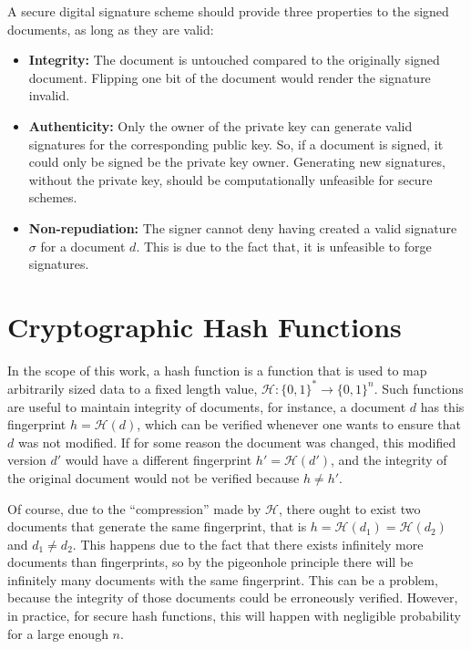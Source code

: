 \documentclass{ufsctex/ufsctex}
\begin{document}
A secure digital signature scheme should provide three properties to the signed
documents, as long as they are valid:

\begin{itemize}

	\item \textbf{Integrity:} The document is untouched compared to the
	originally signed document. Flipping one bit of the document would render
	the signature invalid.

	\item \textbf{Authenticity:} Only the owner of the private key can generate
	valid signatures for the corresponding public key. So, if a document is
	signed, it could only be signed be the private key owner. Generating new
	signatures, without the private key, should be computationally unfeasible
	for secure schemes.

	\item \textbf{Non-repudiation:} The signer cannot deny having created a
	valid signature $\sigma$ for a document $d$. This is due to the fact that,
	it is unfeasible to forge signatures.

\end{itemize}

\section{Cryptographic Hash Functions}

In the scope of this work, a hash function is a function that is used to map
arbitrarily sized data to a fixed length value,  $\mathcal{H}:\{0,
1\}^* \rightarrow \{0, 1\}^n$. Such functions are useful to maintain integrity
of documents, for instance, a document $d$ has this fingerprint $h =
\mathcal{H}(d)$, which can be verified whenever one wants to ensure that $d$
was not modified. If for some reason the document was changed, this modified
version $d'$ would have a different fingerprint $h' = \mathcal{H}(d')$, and the
integrity of the original document would not be verified because $h \ne h'$.

Of course, due to the ``compression'' made by $\mathcal{H}$, there ought to
exist two documents that generate the same fingerprint, that is $h =
\mathcal{H}(d_1) = \mathcal{H}(d_2)$ and $d_1 \ne d_2$. This happens due to the
fact that there exists infinitely more documents than fingerprints, so by the
pigeonhole principle there will be infinitely many documents with the same
fingerprint. This can be a problem, because the integrity of those documents
could be erroneously verified. However, in practice, for secure hash functions,
this will happen with negligible probability for a large enough $n$.
\end{document}
